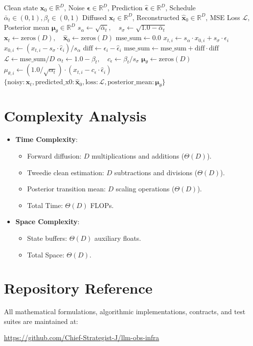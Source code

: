\documentclass[11pt,a4paper]{article}
\theoremstyle{definition}
\begin{document}
\begin{algorithm}[H]
\caption{DDPM Forward Diffusion Step and Posterior Mean Calculation}
\label{alg:ddpm}
\begin{algorithmic}[1]
\Require Clean state $\mathbf{x}_0 \in \mathbb{R}^D$, Noise $\boldsymbol{\epsilon} \in \mathbb{R}^D$, Prediction $\hat{\boldsymbol{\epsilon}} \in \mathbb{R}^D$, Schedule $\bar{\alpha}_t \in (0, 1), \beta_t \in (0, 1)$
\Ensure Diffused $\mathbf{x}_t \in \mathbb{R}^D$, Reconstructed $\hat{\mathbf{x}}_0 \in \mathbb{R}^D$, MSE Loss $\mathcal{L}$, Posterior mean $\boldsymbol{\mu}_\theta \in \mathbb{R}^D$
\State $s_{\alpha} \gets \sqrt{\bar{\alpha}_t}, \quad s_{\sigma} \gets \sqrt{1.0 - \bar{\alpha}_t}$
\State $\mathbf{x}_t \gets \text{zeros}(D), \quad \hat{\mathbf{x}}_0 \gets \text{zeros}(D)$
\State $\text{mse\_sum} \gets 0.0$
    \State $x_{t, i} \gets s_{\alpha} \cdot x_{0, i} + s_{\sigma} \cdot \epsilon_i$
    \State $\hat{x}_{0, i} \gets (x_{t, i} - s_{\sigma} \cdot \hat{\epsilon}_i) / s_{\alpha}$
    \State $\text{diff} \gets \epsilon_i - \hat{\epsilon}_i$
    \State $\text{mse\_sum} \gets \text{mse\_sum} + \text{diff} \cdot \text{diff}$
\EndFor
\State $\mathcal{L} \gets \text{mse\_sum} / D$
\State $\alpha_t \gets 1.0 - \beta_t, \quad c_{\epsilon} \gets \beta_t / s_{\sigma}$
\State $\boldsymbol{\mu}_\theta \gets \text{zeros}(D)$
    \State $\mu_{\theta, i} \gets (1.0 / \sqrt{\alpha_t}) \cdot (x_{t, i} - c_{\epsilon} \cdot \hat{\epsilon}_i)$
\EndFor
\State \Return $\{\text{noisy}: \mathbf{x}_t, \text{predicted\_x0}: \hat{\mathbf{x}}_0, \text{loss}: \mathcal{L}, \text{posterior\_mean}: \boldsymbol{\mu}_\theta\}$
\end{algorithmic}
\end{algorithm}

\section{Complexity Analysis}
\begin{itemize}
    \item \textbf{Time Complexity}:
    \begin{itemize}
        \item Forward diffusion: $D$ multiplications and additions ($\Theta(D)$).
        \item Tweedie clean estimation: $D$ subtractions and divisions ($\Theta(D)$).
        \item Posterior transition mean: $D$ scaling operations ($\Theta(D)$).
        \item Total Time: $\Theta(D)$ FLOPs.
    \end{itemize}
    \item \textbf{Space Complexity}:
    \begin{itemize}
        \item State buffers: $\Theta(D)$ auxiliary floats.
        \item Total Space: $\Theta(D)$.
    \end{itemize}
\end{itemize}

\section{Repository Reference}
All mathematical formulations, algorithmic implementations, contracts, and test suites are maintained at:
\begin{center}
\url{https://github.com/Chief-Strategist-J/llm-obs-infra}
\end{center}
\end{document}
